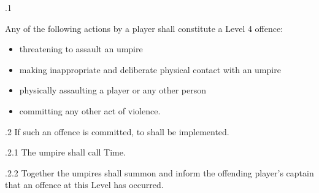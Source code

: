\documentclass[12pt]{article}
\begin{document}
\vspace{\baselineskip}
{\fontsize{9pt}{10.8pt}.1 \tabto{0.49in} {\fontsize{8pt}{9.6pt}\selectfont Any of the following actions by a player shall constitute a Level 4 offence:\par}\par}\par


\vspace{\baselineskip}
\begin{itemize}
	\item {\fontsize{9pt}{10.8pt}\selectfont threatening to assault an umpire\par}\par


\vspace{\baselineskip}
	\item {\fontsize{9pt}{10.8pt}\selectfont making inappropriate and deliberate physical contact with an umpire\par}\par


\vspace{\baselineskip}
	\item {\fontsize{9pt}{10.8pt}\selectfont physically assaulting a player or any other person\par}\par


\vspace{\baselineskip}
	\item {\fontsize{9pt}{10.8pt}\selectfont committing any other act of violence.\par}
\end{itemize}\par


\vspace{\baselineskip}
{\fontsize{9pt}{10.8pt}.2 \tabto{0.49in} If such an offence is committed, to shall be implemented.\par}\par


\vspace{\baselineskip}
\begin{adjustwidth}{0.49in}{0.0in}
{\fontsize{9pt}{10.8pt}.2.1 \tabto{1.17in} The umpire shall call Time.\par}\par

\end{adjustwidth}


\vspace{\baselineskip}
\begin{adjustwidth}{1.18in}{0.04in}
{\fontsize{9pt}{10.8pt}.2.2 \tabto{1.17in} Together the umpires shall summon and inform the offending player’s captain that an offence at this Level has occurred.\par}\par

\end{adjustwidth}
\end{document}
